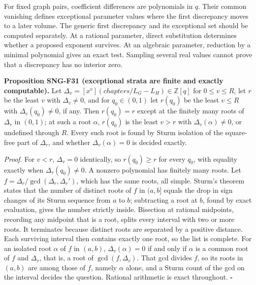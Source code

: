 \documentclass[
  11pt,
  a4paper,
]{report}
\begin{document}
For fixed graph pairs, coefficient differences are polynomials in \(q\).
Their common vanishing defines exceptional parameter values where the
first discrepancy moves to a later volume. The generic first discrepancy
and its exceptional set should be computed separately. At a rational
parameter, direct substitution determines whether a proposed exponent
survives. At an algebraic parameter, reduction by a minimal polynomial
gives an exact test. Sampling several real values cannot prove that a
discrepancy has no interior zero.

\textbf{Proposition SNG-F31 (exceptional strata are finite and exactly
computable).} Let \(\Delta_v=[x^v](chapters/L_G-L_H)\in\mathbb Z[q]\)
for \(0\le v\le R\), let \(r\) be the least \(v\) with \(\Delta_v\ne0\),
and for \(q_0\in(0,1)\) let \(r(q_0)\) be the least \(v\le R\) with
\(\Delta_v(q_0)\ne0\), if any. Then \(r(q_0)=r\) except at the finitely
many roots of \(\Delta_r\) in \((0,1)\); at such a root \(\alpha\),
\(r(q_0)\) is the least \(v>r\) with \(\Delta_v(\alpha)\ne0\), or
undefined through \(R\). Every such root is found by Sturm isolation of
the square-free part of \(\Delta_r\), and whether \(\Delta_v(\alpha)=0\)
is decided exactly.

\emph{Proof.} For \(v<r\), \(\Delta_v=0\) identically, so
\(r(q_0)\ge r\) for every \(q_0\), with equality exactly when
\(\Delta_r(q_0)\ne0\). A nonzero polynomial has finitely many roots. Let
\(f=\Delta_r/\gcd(\Delta_r,\Delta_r')\), which has the same roots, all
simple. Sturm's theorem states that the number of distinct roots of
\(f\) in \((a,b]\) equals the drop in sign changes of its Sturm sequence
from \(a\) to \(b\); subtracting a root at \(b\), found by exact
evaluation, gives the number strictly inside. Bisection at rational
midpoints, recording any midpoint that is a root, splits every interval
with two or more roots. It terminates because distinct roots are
separated by a positive distance. Each surviving interval then contains
exactly one root, so the list is complete. For an isolated root
\(\alpha\) of \(f\) in \((a,b)\), \(\Delta_v(\alpha)=0\) if and only if
\(\alpha\) is a common root of \(f\) and \(\Delta_v\), that is, a root
of \(\gcd(f,\Delta_v)\). That gcd divides \(f\), so its roots in
\((a,b)\) are among those of \(f\), namely \(\alpha\) alone, and a Sturm
count of the gcd on the interval decides the question. Rational
arithmetic is exact throughout. \(\square\)
\end{document}
